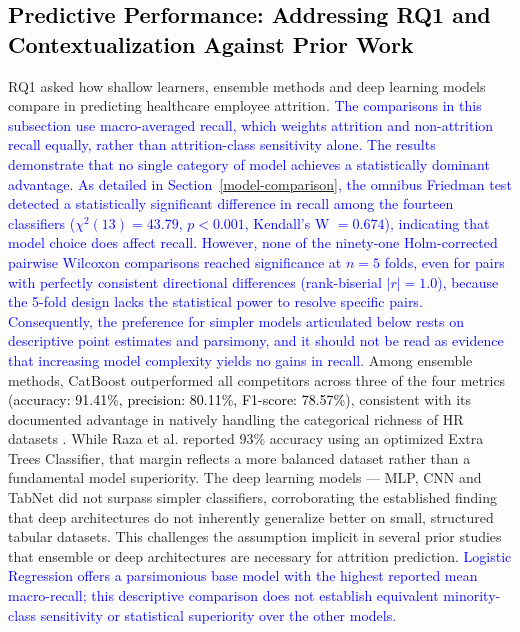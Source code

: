 \documentclass[a4paper,fleqn]{cas-sc}
\begin{document}
{\subsection{\textcolor{black}{Predictive Performance: Addressing RQ1 and Contextualization Against Prior Work}}
RQ1 asked how shallow learners, ensemble methods and deep learning models compare in predicting healthcare employee attrition. \textcolor{blue}{The comparisons in this subsection use macro-averaged recall, which weights attrition and non-attrition recall equally, rather than attrition-class sensitivity alone. The results demonstrate that no single category of model achieves a statistically dominant advantage. As detailed in Section~\ref{model-comparison}, the omnibus Friedman test detected a statistically significant difference in recall among the fourteen classifiers ($\chi^2(13) = 43.79$, $p < 0.001$, Kendall's W $= 0.674$), indicating that model choice does affect recall. However, none of the ninety-one Holm-corrected pairwise Wilcoxon comparisons reached significance at $n = 5$ folds, even for pairs with perfectly consistent directional differences (rank-biserial $|r| = 1.0$), because the 5-fold design lacks the statistical power to resolve specific pairs. Consequently, the preference for simpler models articulated below rests on descriptive point estimates and parsimony, and it should not be read as evidence that increasing model complexity yields no gains in recall.}
Among ensemble methods, CatBoost outperformed all competitors across three of the four metrics (\textcolor{black}{accuracy: 91.41\%, precision: 80.11\%, F1-score: 78.57\%}), consistent with its documented advantage in natively handling the categorical richness of HR datasets \cite{prokhorenkova2018catboost}. While Raza et al. \cite{app12136424} reported 93\% accuracy using an optimized Extra Trees Classifier, that margin reflects a more balanced dataset rather than a fundamental model superiority. The deep learning models — MLP, CNN and TabNet did not surpass simpler classifiers, corroborating the established finding that deep architectures do not inherently generalize better on small, structured tabular datasets. This challenges the assumption implicit in several prior studies \cite{app12136424, Akasheh2024} that ensemble or deep architectures are necessary for attrition prediction. \textcolor{blue}{Logistic Regression offers a parsimonious base model with the highest reported mean macro-recall; this descriptive comparison does not establish equivalent minority-class sensitivity or statistical superiority over the other models.}

}
\end{document}
